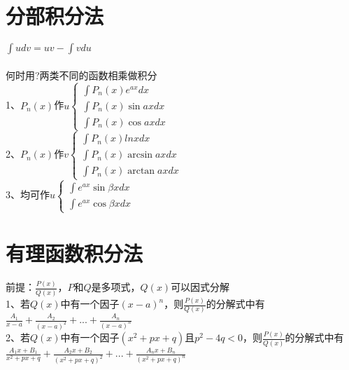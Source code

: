 \documentclass{article}
\begin{document}
\begin{flushleft}
	\section{分部积分法}
	
	$\int udv=uv-\int vdu$\\
	~\\
	何时用?两类不同的函数相乘做积分\\
	1、$P_n(x)$作$u \left\{
	\begin{array}{lcl}
	\int P_n(x)e^{ax}dx\\
	\int P_n(x)\sin axdx\\
	\int P_n(x)\cos axdx
	\end{array} \right.$\\
	2、$P_n(x)$作$v \left\{
	\begin{array}{lcl}
	\int P_n(x)lnxdx\\
	\int P_n(x)\arcsin axdx\\
	\int P_n(x)\arctan axdx
	\end{array} \right.$\\
	3、均可作$u \left\{
	\begin{array}{lcl}
	\int e^{ax}\sin \beta xdx\\
	\int e^{ax}\cos \beta xdx
	\end{array} \right.$\\
	
	\section{有理函数积分法}
	
	前提：$\frac{P(x)}{Q(x)}$，$P$和$Q$是多项式，$Q(x)$可以因式分解\\
	1、若$Q(x)$中有一个因子$(x-a)^n$，则$\frac{P(x)}{Q(x)}$的分解式中有$\frac{A_1}{x-a}+\frac{A_2}{(x-a)^2}+...+\frac{A_n}{(x-a)^n}$\\
	2、若$Q(x)$中有一个因子$(x^2+px+q)$且$p^2-4q<0$，则$\frac{P(x)}{Q(x)}$的分解式中有$\frac{A_1x+B_1}{x^2+px+q}+\frac{A_2x+B_2}{(x^2+px+q)^2}+...+\frac{A_nx+B_n}{(x^2+px+q)^n}$\\
\end{flushleft}
\end{document}
